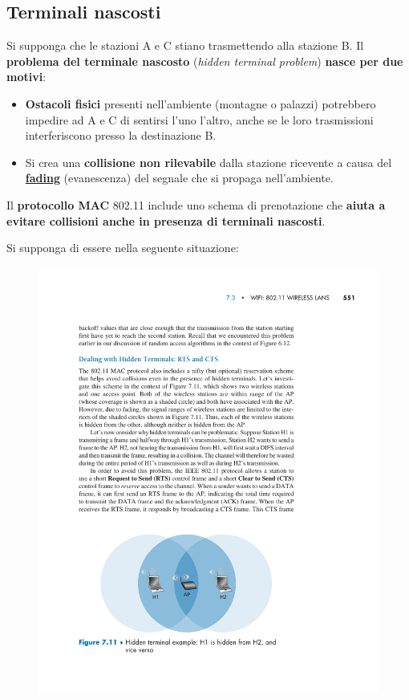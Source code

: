 \documentclass[a4paper]{article}
\begin{document}
	\subsection{Terminali nascosti}
	
	Si supponga che le stazioni A e C stiano trasmettendo alla stazione B. Il \textcolor{Red3}{\textbf{problema del terminale nascosto}} (\emph{hidden terminal problem}) \textbf{nasce per due motivi}:
	\begin{itemize}
		\item \textbf{Ostacoli fisici} presenti nell’ambiente (montagne o palazzi) potrebbero impedire ad A e C di sentirsi l’uno l’altro, anche se le loro trasmissioni interferiscono presso la destinazione B.
		
		\item Si crea una \textbf{collisione non rilevabile} dalla stazione ricevente a causa del \textbf{\underline{fading}} (evanescenza) del segnale che si propaga nell’ambiente.
	\end{itemize}
	Il \textbf{protocollo MAC} 802.11 include uno schema di prenotazione che \textbf{aiuta a evitare collisioni anche in presenza di terminali nascosti}.\newline
	
	\noindent
	Si supponga di essere nella seguente situazione:
	\begin{figure}[!htp]
		\centering
		\includegraphics[width=.7\textwidth]{img/terminali_nascosti_situazione.pdf}
	\end{figure}
\end{document}
